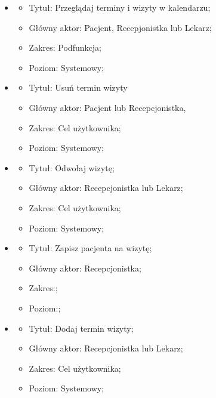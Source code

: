 \documentclass[polish,12pt]{aghthesis}
\begin{document}
\begin{itemize}
\item 
        \begin{itemize}
            \item Tytuł: Przeglądaj terminy i wizyty w kalendarzu;
            \item Główny aktor: Pacjent, Recepjonistka lub Lekarz;
            \item Zakres: Podfunkcja;
            \item Poziom: Systemowy;
        \end{itemize}
\item 
        \begin{itemize}
            \item Tytuł: Usuń termin wizyty
            \item Główny aktor: Pacjent lub Recepcjonistka,
            \item Zakres: Cel użytkownika;
            \item Poziom: Systemowy;
        \end{itemize}
\item 
        \begin{itemize}
            \item Tytuł: Odwołaj wizytę;
            \item Główny aktor: Recepcjonistka lub Lekarz;
            \item Zakres: Cel użytkownika;
            \item Poziom: Systemowy;
        \end{itemize}
\item 
        \begin{itemize}
            \item Tytuł: Zapisz pacjenta na wizytę;
            \item Główny aktor: Recepcjonistka;
            \item Zakres:;
            \item Poziom:;
        \end{itemize}
\item 
        \begin{itemize}
            \item Tytuł: Dodaj termin wizyty;
            \item Główny aktor: Recepcjonistka lub Lekarz;
            \item Zakres: Cel użytkownika;
            \item Poziom: Systemowy;
        \end{itemize}
\end{itemize}
 
\end{document}
